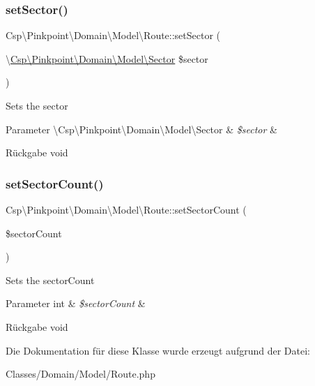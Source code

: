 \subsubsection{\texorpdfstring{set\+Sector()}{setSector()}}
{\footnotesize\ttfamily Csp\textbackslash{}\+Pinkpoint\textbackslash{}\+Domain\textbackslash{}\+Model\textbackslash{}\+Route\+::set\+Sector (\begin{DoxyParamCaption}\item[{\textbackslash{}\hyperlink{classCsp_1_1Pinkpoint_1_1Domain_1_1Model_1_1Sector}{Csp\textbackslash{}\+Pinkpoint\textbackslash{}\+Domain\textbackslash{}\+Model\textbackslash{}\+Sector}}]{\$sector }\end{DoxyParamCaption})}

Sets the sector


\begin{DoxyParams}[1]{Parameter}
\textbackslash{}\+Csp\textbackslash{}\+Pinkpoint\textbackslash{}\+Domain\textbackslash{}\+Model\textbackslash{}\+Sector & {\em \$sector} & \\
\hline
\end{DoxyParams}
\begin{DoxyReturn}{Rückgabe}
void 
\end{DoxyReturn}
\mbox{\label{classCsp_1_1Pinkpoint_1_1Domain_1_1Model_1_1Route_a5b9d0508e544a9535851a6d3cd40f9f7}} 
\subsubsection{\texorpdfstring{set\+Sector\+Count()}{setSectorCount()}}
{\footnotesize\ttfamily Csp\textbackslash{}\+Pinkpoint\textbackslash{}\+Domain\textbackslash{}\+Model\textbackslash{}\+Route\+::set\+Sector\+Count (\begin{DoxyParamCaption}\item[{}]{\$sector\+Count }\end{DoxyParamCaption})}

Sets the sector\+Count


\begin{DoxyParams}[1]{Parameter}
int & {\em \$sector\+Count} & \\
\hline
\end{DoxyParams}
\begin{DoxyReturn}{Rückgabe}
void 
\end{DoxyReturn}


Die Dokumentation für diese Klasse wurde erzeugt aufgrund der Datei\+:\begin{DoxyCompactItemize}
\item 
Classes/\+Domain/\+Model/Route.\+php\end{DoxyCompactItemize}
